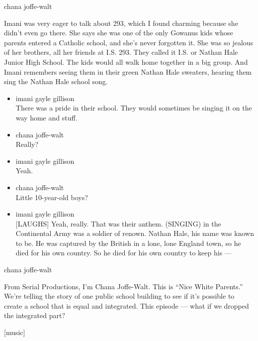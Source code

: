 chana joffe-walt

Imani was very eager to talk about 293, which I found charming because
she didn't even go there. She says she was one of the only Gowanus kids
whose parents entered a Catholic school, and she's never forgotten it.
She was so jealous of her brothers, all her friends at I.S. 293. They
called it I.S. or Nathan Hale Junior High School. The kids would all
walk home together in a big group. And Imani remembers seeing them in
their green Nathan Hale sweaters, hearing them sing the Nathan Hale
school song.

\begin{itemize}
\item
  imani gayle gillison\\
  There was a pride in their school. They would sometimes be singing it
  on the way home and stuff.
\item
  chana joffe-walt\\
  Really?
\item
  imani gayle gillison\\
  Yeah.
\item
  chana joffe-walt\\
  Little 10-year-old boys?
\item
  imani gayle gillison\\
  {[}LAUGHS{]} Yeah, really. That was their anthem. (SINGING) in the
  Continental Army was a soldier of renown. Nathan Hale, his name was
  known to be. He was captured by the British in a lone, lone England
  town, so he died for his own country. So he died for his own country
  to keep his ---
\end{itemize}

chana joffe-walt

From Serial Productions, I'm Chana Joffe-Walt. This is ``Nice White
Parents.'' We're telling the story of one public school building to see
if it's possible to create a school that is equal and integrated. This
episode --- what if we dropped the integrated part?

{[}music{]}

